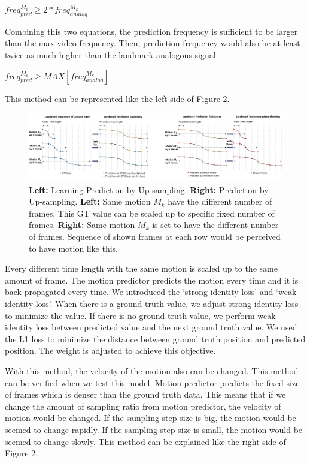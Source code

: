 \documentclass[10pt,twocolumn,letterpaper]{article}
\begin{document}
\bigskip
\begin{center}
$freq_{pred}^{M_k} \geq 2 \ast freq_{analog}^{M_k} $
\end{center}
\bigskip

Combining this two equations, the prediction frequency is sufficient to be larger than the max video frequency. Then, prediction frequency would also be at least twice as much higher than the landmark analogous signal.

\bigskip
\begin{center}
$freq_{pred}^{M_k} \geq MAX[freq_{analog}^{M_k}] $
\end{center}
\bigskip

This method can be represented like the left side of Figure 2.

\begin{figure}
\begin{center}
\includegraphics [scale=0.38] {images/upsample.jpg}
\end{center}
 \caption{\textbf{Left:} Learning Prediction by Up-sampling. \textbf{Right:} Prediction by Up-sampling. \textbf{Left:} Same motion $M_k$ have the different number of frames. This GT value can be scaled up to specific fixed number of frames. \textbf{Right:} Same motion $M_k$ is set to have the different number of frames. Sequence of shown frames at each row would be perceived to have motion like this.}
\label{fig:short}
\end{figure}

Every different time length with the same motion is scaled up to the same amount of frame. The motion predictor predicts the motion every time and it is back-propagated every time. We introduced the ‘strong identity loss’ and ‘weak identity loss’. When there is a ground truth value, we adjust strong identity loss to minimize the value. If there is no ground truth value, we perform weak identity loss between predicted value and the next ground truth value. We used the L1 loss to minimize the distance between ground truth position and predicted position. The weight is adjusted to achieve this objective.

With this method, the velocity of the motion also can be changed. This method can be verified when we test this model. Motion predictor predicts the fixed size of frames which is denser than the ground truth data. This means that if we change the amount of sampling ratio from motion predictor, the velocity of motion would be changed. If the sampling step size is big, the motion would be seemed to change rapidly. If the sampling step size is small, the motion would be seemed to change slowly. This method can be explained like the right side of Figure 2.
\end{document}
